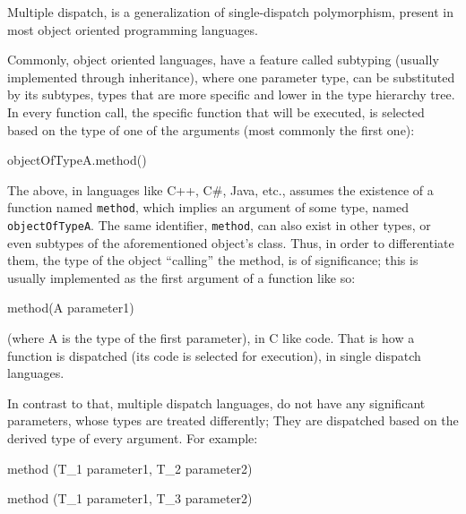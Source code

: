 \documentclass[]{article}
\newenvironment{Shaded}{}{}
\newcommand{\NormalTok}[1]{#1}
\begin{document}
Multiple dispatch, is a generalization of single-dispatch polymorphism,
present in most object oriented programming languages.

Commonly, object oriented languages, have a feature called subtyping
(usually implemented through inheritance), where one parameter type, can
be substituted by its subtypes, types that are more specific and lower
in the type hierarchy tree. In every function call, the specific
function that will be executed, is selected based on the type of one of
the arguments (most commonly the first one):

\begin{Shaded}
\begin{Highlighting}[]
\NormalTok{objectOfTypeA.method()}
\end{Highlighting}
\end{Shaded}

The above, in languages like C++, C\#, Java, etc., assumes the existence
of a function named \texttt{method}, which implies an argument of some
type, named \texttt{objectOfTypeA}. The same identifier,
\texttt{method}, can also exist in other types, or even subtypes of the
aforementioned object's class. Thus, in order to differentiate them, the
type of the object ``calling'' the method, is of significance; this is
usually implemented as the first argument of a function like so:

\begin{Shaded}
\begin{Highlighting}[]
\NormalTok{method(A parameter1)}
\end{Highlighting}
\end{Shaded}

(where A is the type of the first parameter), in C like code. That is
how a function is dispatched (its code is selected for execution), in
single dispatch languages.

In contrast to that, multiple dispatch languages, do not have any
significant parameters, whose types are treated differently; They are
dispatched based on the derived type of every argument. For example:

\begin{Shaded}
\begin{Highlighting}[]
\NormalTok{method (T_1 parameter1, T_2 parameter2)}
\end{Highlighting}
\end{Shaded}

\begin{Shaded}
\begin{Highlighting}[]
\NormalTok{method (T_1 parameter1, T_3 parameter2)}
\end{Highlighting}
\end{Shaded}
\end{document}
